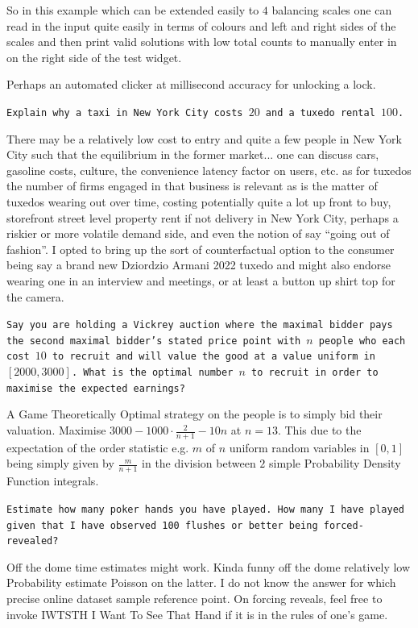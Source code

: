 So in this example which can be extended easily to $4$ balancing scales one can read in the input quite easily in terms of colours and left and right sides of the scales and then print valid solutions with low total counts to manually enter in on the right side of the test widget.

Perhaps an automated clicker at millisecond accuracy for unlocking a lock.

\texttt{Explain why a taxi in New York City costs $20$ and a tuxedo rental $100$.}

There may be a relatively low cost to entry and quite a few people in New York City such that the equilibrium in the former market... one can discuss cars, gasoline costs, culture, the convenience latency factor on users, etc. as for tuxedos the number of firms engaged in that business is relevant as is the matter of tuxedos wearing out over time, costing potentially quite a lot up front to buy, storefront street level property rent if not delivery in New York City, perhaps a riskier or more volatile demand side, and even the notion of say ``going out of fashion''. I opted to bring up the sort of counterfactual option to the consumer being say a brand new Dziordzio Armani 2022 tuxedo and might also endorse wearing one in an interview and meetings, or at least a button up shirt top for the camera.

\texttt{Say you are holding a Vickrey auction where the maximal bidder pays the second maximal bidder's stated price point with $n$ people who each cost $10$ to recruit and will value the good at a value uniform in $[2000, 3000]$. What is the optimal number $n$ to recruit in order to maximise the expected earnings?}

A Game Theoretically Optimal strategy on the people is to simply bid their valuation. Maximise $3000 - 1000 \cdot \frac{2}{n + 1} - 10 n$ at $n = \boxed{13}$. This due to the expectation of the order statistic e.g. $m$ of $n$ uniform random variables in $[0, 1]$ being simply given by $\frac{m}{n + 1}$ in the division between $2$ simple Probability Density Function integrals.

\texttt{Estimate how many poker hands you have played. How many I have played given that I have observed 100 flushes or better being forced-revealed?}

Off the dome time estimates might work. Kinda funny off the dome relatively low Probability estimate Poisson on the latter. I do not know the answer for which precise online dataset sample reference point. On forcing reveals, feel free to invoke IWTSTH I Want To See That Hand if it is in the rules of one's game.

